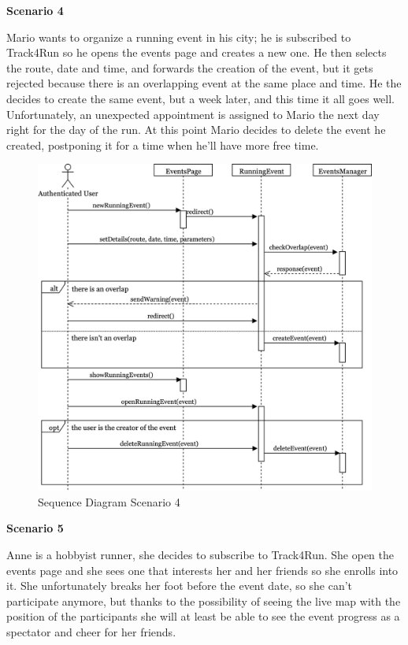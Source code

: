 \documentclass[../main.tex]{subfiles}
\begin{document}
		\begin{minipage}{\textwidth}
			{\bf Scenario 4}
			\vspace{3mm}

			Mario wants to organize a running event in his city; he is subscribed to Track4Run so he opens the events page and creates a new one. He then selects the route, date and time, and forwards the creation of the event, but it gets rejected because there is an overlapping event at the same place and time. He the decides to create the same event, but a week later, and this time it all goes well. Unfortunately, an unexpected appointment is assigned to Mario the next day right for the day of the run. At this point Mario decides to delete the event he created, postponing it for a time when he'll have more free time.
			\vspace{5mm}
		\end{minipage}
		\begin{figure}[H]
			\centering
			\includegraphics[scale=.07]{images/sequenceDiagram4.png}
			\caption{Sequence Diagram Scenario 4 \label{fig:Sequence Diagram Scenario 4}}
		\end{figure}
		\begin{minipage}{\textwidth}

		\end{minipage}
		\begin{minipage}{\textwidth}
			{\bf Scenario 5}
			\vspace{3mm}

			Anne is a hobbyist runner, she decides to subscribe to Track4Run. She open the events page and she sees one that interests her and her friends so she enrolls into it. She unfortunately breaks her foot before the event date, so she can't participate anymore, but thanks to the possibility of seeing the live map with the position of the participants she will at least be able to see the event progress as a spectator and cheer for her friends.
			\vspace{5mm}
		\end{minipage}
\end{document}
